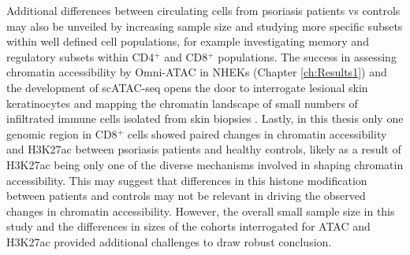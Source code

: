 Additional differences between circulating cells from psoriasis patients vs controls may also be unveiled by increasing sample size and studying more specific subsets within well defined cell populations, for example investigating memory and regulatory subsets within CD4$^+$ and CD8$^+$ populations. The success in assessing chromatin accessibility by Omni-ATAC in NHEKs (Chapter \ref{ch:Results1}) and the development of scATAC-seq opens the door to interrogate lesional skin keratinocytes and mapping the chromatin landscape of small numbers of infiltrated immune cells isolated from skin biopsies  \parencite{Buenrostro2015,Corces2017}. Lastly, in this thesis only one genomic region in CD8$^+$ cells showed paired changes in chromatin accessibility and H3K27ac between psoriasis patients and healthy controls, likely as a result of H3K27ac being only one of the diverse mechanisms involved in shaping chromatin accessibility. This may suggest that differences in this histone modification between patients and controls may not be relevant in driving the observed changes in chromatin accessibility. However, the overall small sample size in this study and the differences in sizes of the cohorts interrogated for ATAC and H3K27ac provided additional challenges to draw robust conclusion. 









